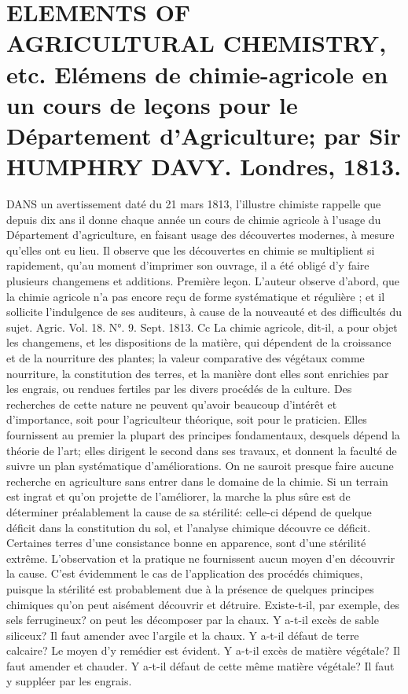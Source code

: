 \setcounter{page}{329}
\section{ELEMENTS OF AGRICULTURAL CHEMISTRY, etc. Elémens de chimie-agricole en un cours de leçons pour le Département d'Agriculture; par Sir HUMPHRY DAVY. Londres, 1813.}
DANS un avertissement daté du 21 mars 1813, l'illustre chimiste rappelle que depuis dix ans il donne chaque année un cours de chimie agricole à l'usage du Département d'agriculture, en faisant usage des découvertes modernes, à mesure qu'elles ont eu lieu. Il observe que les découvertes en chimie se multiplient si rapidement, qu'au moment d'imprimer son ouvrage, il a été obligé d'y faire plusieurs changemens et additions.
Première leçon.
L'auteur observe d'abord, que la chimie agricole n'a pas encore reçu de forme systématique et régulière ; et il sollicite l'indulgence de ses auditeurs, à cause de la nouveauté et des difficultés du sujet.
Agric. Vol. 18. N°. 9. Sept. 1813. Cc\setcounter{page}{330} La chimie agricole, dit-il, a pour objet les changemens, et les dispositions de la matière, qui dépendent de la croissance et de la nourriture des plantes; la valeur comparative des végétaux comme nourriture, la constitution des terres, et la manière dont elles sont enrichies par les engrais, ou rendues fertiles par les divers procédés de la culture. Des recherches de cette nature ne peuvent qu’avoir beaucoup d’intérêt et d’importance, soit pour l’agriculteur théorique, soit pour le praticien. Elles fournissent au premier la plupart des principes fondamentaux, desquels dépend la théorie de l’art; elles dirigent le second dans ses travaux, et donnent la faculté de suivre un plan systématique d’améliorations. On ne sauroit presque faire aucune recherche en agriculture sans entrer dans le domaine de la chimie. Si un terrain est ingrat et qu’on projette de l’améliorer, la marche la plus sûre est de déterminer préalablement la cause de sa stérilité: celle-ci dépend de quelque déficit dans la constitution du sol, et l’analyse chimique découvre ce déficit. Certaines terres d’une consistance bonne en apparence, sont d’une stérilité extrême. L’observation et la pratique ne fournissent\setcounter{page}{331} aucun moyen d’en découvrir la cause. C’est évidemment le cas de l’application des procédés chimiques, puisque la stérilité est probablement due à la présence de quelques principes chimiques qu’on peut aisément découvrir et détruire. Existe-t-il, par exemple, des sels ferrugineux? on peut les décomposer par la chaux. Y a-t-il excès de sable siliceux? Il faut amender avec l’argile et la chaux. Y a-t-il défaut de terre calcaire? Le moyen d’y remédier est évident. Y a-t-il excès de matière végétale? Il faut amender et chauder. Y a-t-il défaut de cette même matière végétale? Il faut y suppléer par les engrais.
